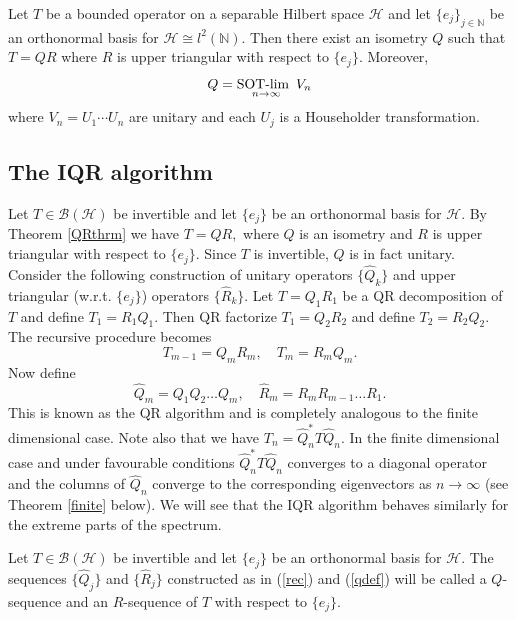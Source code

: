 \documentclass[a4paper,10pt]{article}
\begin{document}
\begin{theorem}\label{QRthrm}
Let $T$ be a bounded operator on a separable Hilbert space
$\mathcal{H}$ and let
$\{e_j\}_{j\in\mathbb{N}}$ be an orthonormal basis for
$\mathcal{H}\cong l^2(\mathbb{N}).$ Then there exist an isometry $Q$ such that $T
= QR$ where $R$ is upper triangular with respect to $\{e_j\}$. 
Moreover, 
$$
Q = \underset{n \rightarrow \infty}{\text{SOT-lim \,}}
V_n
$$ 
where $V_n = U_1 \cdots U_n$ are unitary and each $U_j$ is a Householder transformation. 
\end{theorem}


\subsection{The IQR algorithm}

Let $T \in \mathcal{B}(\mathcal{H})$ be invertible and let $\{e_j\}$
be an orthonormal basis for $\mathcal{H}$. By Theorem
\ref{QRthrm} we have $T = QR,$ where $Q$ is an isometry and $R$ is upper
triangular with respect to $\{e_j\}.$ Since $T$ is invertible, $Q$ is in fact unitary. Consider the following
construction of unitary operators $\{\hat Q_k\}$ and upper triangular
(w.r.t. $\{e_j\}$) operators $\{\hat R_k\}.$ Let $T = Q_1R_1$ be a QR
decomposition of $T$ and define $T_1 =
R_1Q_1.$ Then QR factorize $T_1 = Q_2R_2$ and define
$T_2 = 
R_2Q_2.$ The recursive procedure becomes 
\begin{equation}\label{rec}
T_{m-1} = Q_mR_m, \quad T_m = R_mQ_m.
\end{equation}
Now define 
\begin{equation}\label{qdef}
\hat Q_m = Q_1Q_2 \hdots Q_m, \quad \hat R_m = R_mR_{m-1}\hdots R_1. 
\end{equation}
This is known as the QR algorithm and is completely analogous to the finite dimensional case. Note also that we have $T_n = \hat{Q}^*_n T \hat{Q}_n.$ In the finite dimensional case and under favourable conditions $\hat{Q}_n^*T\hat{Q}_n$ converges to a diagonal operator and the columns of $\hat{Q}_n$ converge to the corresponding eigenvectors as $n\rightarrow\infty$ (see Theorem \ref{finite} below). We will see that the IQR algorithm behaves similarly for the extreme parts of the spectrum.


\begin{definition}
Let $T \in \mathcal{B}(\mathcal{H})$ be invertible and let $\{e_j\}$
be an orthonormal basis for $\mathcal{H}$. The sequences
$\{\hat Q_j\}$ and $\{\hat R_j\}$ constructed as in (\ref{rec}) and
(\ref{qdef}) will be 
called a $Q$-sequence and an $R$-sequence of $T$ with respect to
$\{e_j\}.$ 
\end{definition}
\end{document}
